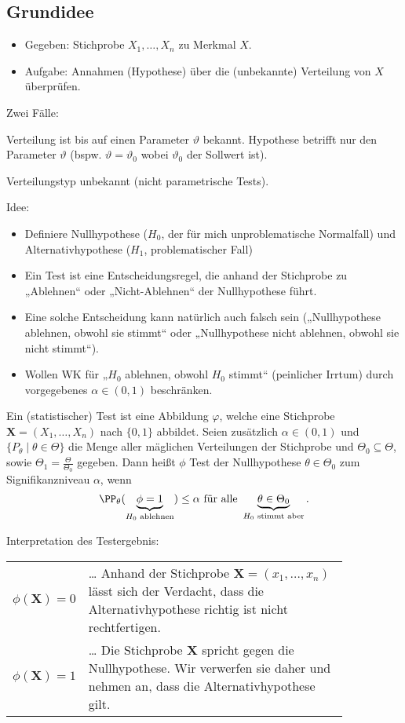\subsection{Grundidee}
\begin{itemize}
\item Gegeben: Stichprobe $X_1, \ldots, X_n$ zu Merkmal $X$.
\item Aufgabe: Annahmen (Hypothese) über die (unbekannte) Verteilung von $X$ überprüfen.
\end{itemize}
Zwei Fälle:
\begin{anumerate}
\item Verteilung ist bis auf einen Parameter $\vartheta$ bekannt. Hypothese betrifft nur den Parameter $\vartheta$ (bspw. $\vartheta = \vartheta _0$ wobei $\vartheta_0$ der Sollwert ist).
\item Verteilungstyp unbekannt (nicht parametrische Tests).
\end{anumerate}
Idee:
\begin{itemize}
\item Definiere Nullhypothese ($H_0$, der für mich unproblematische Normalfall) und Alternativhypothese ($H_1$, problematischer Fall)
\item Ein Test ist eine Entscheidungsregel, die anhand der Stichprobe zu „Ablehnen“ oder „Nicht-Ablehnen“ der Nullhypothese führt.
\item Eine solche Entscheidung kann natürlich auch falsch sein („Nullhypothese ablehnen, obwohl sie stimmt“ oder „Nullhypothese nicht ablehnen, obwohl sie nicht stimmt“).
\item Wollen WK für „$H_0$ ablehnen, obwohl $H_0$ stimmt“ (peinlicher Irrtum) durch vorgegebenes $\alpha \in (0,1)$ beschränken.
\end{itemize}

 Ein (statistischer) Test ist eine Abbildung $\varphi$, welche eine Stichprobe $\mathbf{X}=(X_1, \ldots, X_n)$ nach $\{0,1\}$ abbildet. Seien zusätzlich $\alpha \in (0,1)$ und $\{P_\theta \;|\; \theta \in \Theta\}$ die Menge aller mäglichen Verteilungen der Stichprobe und $\Theta_0 \subseteq \Theta$, sowie $\Theta_1 = \frac{\Theta}{\Theta_0}$ gegeben. Dann heißt $\phi$ Test der Nullhypothese $\theta \in \Theta_0$ zum Signifikanzniveau $\alpha$, wenn
$$\PP_\theta (\underbrace{\phi = 1}_{H_0\text{ ablehnen}}) \leq \alpha \text{ für alle } \underbrace{\theta \in \Theta_0}_{H_0 \text{ stimmt aber}}\text{.}$$

 Interpretation des Testergebnis:\\
\begin{tabular}{l p{0.85\linewidth}}
$\phi (\mathbf{X}) = 0$ & … Anhand der Stichprobe $\mathbf{X}=(x_1, \ldots, x_n)$ lässt sich der Verdacht, dass die Alternativhypothese richtig ist nicht rechtfertigen.\\
$\phi (\mathbf{X}) = 1$ & … Die Stichprobe $\mathbf{X}$ spricht gegen die Nullhypothese. Wir verwerfen sie daher und nehmen an, dass die Alternativhypothese gilt.
\end{tabular}


